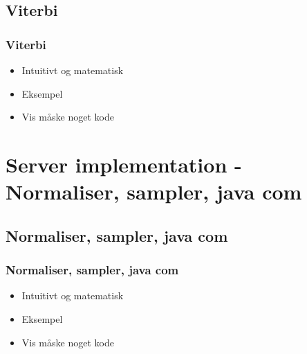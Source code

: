 \subsection{Viterbi}
\begin{frame}
	\frametitle{Viterbi}
	\begin{itemize}
		\item Intuitivt og matematisk
		\item Eksempel
		\item Vis måske noget kode
	\end{itemize}
\end{frame}
\section{Server implementation - Normaliser, sampler, java com}
\subsection{Normaliser, sampler, java com}
\begin{frame}
	\frametitle{Normaliser, sampler, java com}
	\begin{itemize}
		\item Intuitivt og matematisk
		\item Eksempel
		\item Vis måske noget kode
	\end{itemize}
\end{frame}